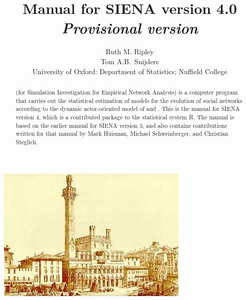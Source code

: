 \documentclass[a4paper,fleqn]{article}
\title{\color{section0}{\Huge Manual for \textsf{SIENA} version 4.0} }
\title{{\Huge Manual for \textsf{SIENA} version 4.0 \protect\newline \normalsize \emph{Provisional version} } }
\author{\color{section1}\Large Ruth M. Ripley\\[1ex]
        \color{section1}\Large Tom A.B.\ Snijders\\[4ex]
       {\color{section1}\large University of Oxford: Department of Statistics; Nuffield College}\\[1ex]
    }
\newcommand{\+}{\, + \,}
\newcommand{\Rn}{{\sf R}}
\newcommand{\SI}{{\sf SIENA }}
\begin{document}
\begin{print}
\end{print}

\maketitle

\begin{screen}
\vfill
\end{screen}
\begin{print}

\vfill
\begin{center}
\includegraphics*[scale=3]{ilcampo.jpg}
\end{center}
\vfill
\end{print}

\begin{abstract}
\noindent \SI (for {\sf Simulation Investigation for Empirical
Network Analysis}) is a computer program that carries out the
statistical estimation of models for the evolution of social
networks according to the dynamic actor-oriented model of \citet{Snijders01,
Snijders05} and \citet{SnijdersEA07}.
This is the manual for \SI version 4, which is a contributed package to
the statistical system \Rn.
The manual is based on the earlier manual for \SI version 3,
and also contains contributions written for that manual by
Mark Huisman, Michael Schweinberger, and Christian Steglich.
\end{abstract}



\end{document}
